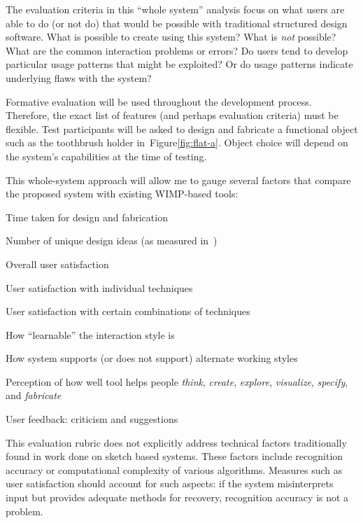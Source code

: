 \documentclass[12pt]{article}
\newenvironment{packed_enum}{
\begin{enumerate}
  \setlength{\itemsep}{1pt}
  \setlength{\parskip}{0pt}
  \setlength{\parsep}{0pt}
}{\end{enumerate}}
\begin{document}
The evaluation criteria in this ``whole system'' analysis focus on
what users are able to do (or not do) that would be possible with
traditional structured design software. What is possible to create
using this system? What is \textit{not} possible? What are the common
interaction problems or errors? Do users tend to develop particular
usage patterns that might be exploited? Or do usage patterns indicate
underlying flaws with the system?

Formative evaluation will be used throughout the development
process. Therefore, the exact list of features (and perhaps evaluation
criteria) must be flexible. Test participants will be asked to design
and fabricate a functional object such as the toothbrush holder
in~Figure\ref{fig:flat-a}. Object choice will depend on the system's
capabilities at the time of testing. 

This whole-system approach will allow me to gauge several factors that
compare the proposed system with existing WIMP-based tools:

\begin{packed_enum}
\item Time taken for design and fabrication
\item Number of unique design ideas (as measured
  in~\cite{goel-sketches-of-thought})
\item Overall user satisfaction
\item User satisfaction with individual techniques
\item User satisfaction with certain combinations of techniques
\item How ``learnable'' the interaction style is
\item How system supports (or does not support) alternate working
  styles
\item Perception of how well tool helps people \textit{think},
  \textit{create}, \textit{explore}, \textit{visualize},
  \textit{specify}, and \textit{fabricate}
\item User feedback: criticism and suggestions
\end{packed_enum}

This evaluation rubric does not explicitly address technical factors
traditionally found in work done on sketch based systems. These
factors include recognition accuracy or computational complexity of
various algorithms. Measures such as user satisfaction should account
for such aspects: if the system misinterprets input but provides
adequate methods for recovery, recognition accuracy is not a problem.
\end{document}
